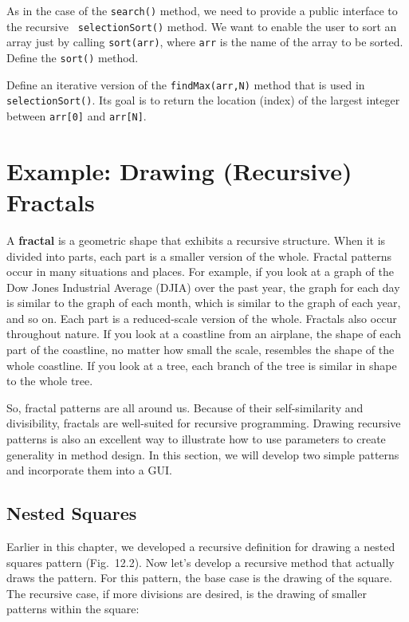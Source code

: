 \label{self-study-exercises}
\begin{SSTUDY}

\item As in the case of the {\tt search()}
method, we need to provide a public interface to the recursive {\tt
selectionSort()} method. We want to enable the user to sort an array
just by calling {\tt sort(arr)}, where {\tt arr} is the name of the
array to be sorted.  Define the {\tt sort()} method.


\item  Define an iterative version of the {\tt findMax(arr,N)} method that is used in
{\tt selectionSort()}. Its goal is to return the location (index) of
the largest integer between {\tt arr[0]} and {\tt arr[N]}.

\end{SSTUDY}

\section{Example: Drawing (Recursive) Fractals}
\label{sec-fractals}\label{pg-sec-fractals}
\noindent A {\bf fractal} is a geometric shape that exhibits a
recursive structure.  When it is divided into parts, each part is a
smaller version of the whole.  Fractal patterns occur in many
situations and places. For example, if you look at a graph of the Dow
Jones Industrial Average (DJIA) over the past year, the graph for each
day is similar to the graph of each month, which is similar to the
graph of each year, and so on.  Each part is a reduced-scale version
of the whole.  Fractals also occur throughout nature. If you look at a
coastline from an airplane, the shape of each part of the coastline,
no matter how small the scale, resembles the shape of the whole
coastline.  If you look at a tree, each branch of the tree is similar
in shape to the whole tree.

So, fractal patterns are all around us.  Because of their
self-similarity and divisibility, fractals are well-suited for
recursive programming.  Drawing recursive patterns is also an
excellent way to illustrate how to use parameters to create generality
in method design.  In this section, we will develop two simple
patterns and incorporate them into a GUI.

\subsection{Nested Squares}
\noindent Earlier in this chapter, we developed a recursive definition
for drawing a nested squares pattern (Fig.~12.2).
Now let's develop a recursive method that actually draws the pattern.
For this pattern, the base case is the drawing of the square.  The
recursive case, if more divisions are desired, is the drawing of
smaller patterns within the square:


